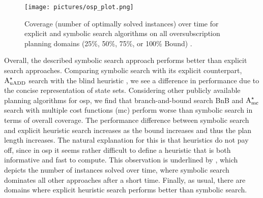 \begin{figure}
    \begin{center}
        \texttt{[image: pictures/osp\_plot.png]}
    \end{center}
    \caption[Coverage over time for oversubscription planning.]{Coverage (number of optimally solved instances) over time for explicit and symbolic search algorithms on all oversubscription planning domains (25\%, 50\%, 75\%, or 100\% Bound) \autocite{speck-katz-aaai2021}.}
    \label{fig:coverage_time_oversubscription}
\end{figure}

Overall, the described symbolic search approach \autocite{speck-katz-aaai2021} performs better than explicit search approaches.
Comparing symbolic search with its explicit counterpart, $\text{A}_\text{\scriptsize{uADD}}^\star$ search with the blind heuristic , we see a difference in performance due to the concise representation of state sets.
Considering other publicly available planning algorithms for osp, we find that branch-and-bound search BnB \autocite{katz-et-al-icaps2019} and $\text{A}_\text{\scriptsize{mc}}^\star$ search with multiple cost functions (mc) \autocite{katz-keyder-icaps2019wshsdip} perform worse than symbolic search in terms of overall coverage.
The performance difference between symbolic search and explicit heuristic search increases as the bound increases and thus the plan length increases.
The natural explanation for this is that heuristics do not pay off, since in osp it seems rather difficult to define a heuristic that is both informative and fast to compute. %
This observation is underlined by , which depicts the number of instances solved over time, where symbolic search dominates all other approaches after a short time.
Finally, as usual, there are domains where explicit heuristic search performs better than symbolic search.


